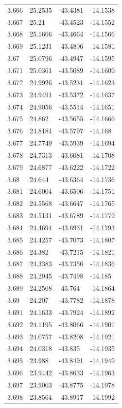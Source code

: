 \begin{tabular}{llll}
3.666 & 25.2535 & -43.4381 & -14.1538 \\
3.667 & 25.21 & -43.4523 & -14.1552 \\
3.668 & 25.1666 & -43.4664 & -14.1566 \\
3.669 & 25.1231 & -43.4806 & -14.1581 \\
3.67 & 25.0796 & -43.4947 & -14.1595 \\
3.671 & 25.0361 & -43.5089 & -14.1609 \\
3.672 & 24.9926 & -43.5231 & -14.1623 \\
3.673 & 24.9491 & -43.5372 & -14.1637 \\
3.674 & 24.9056 & -43.5514 & -14.1651 \\
3.675 & 24.862 & -43.5655 & -14.1666 \\
3.676 & 24.8184 & -43.5797 & -14.168 \\
3.677 & 24.7749 & -43.5939 & -14.1694 \\
3.678 & 24.7313 & -43.6081 & -14.1708 \\
3.679 & 24.6877 & -43.6222 & -14.1722 \\
3.68 & 24.644 & -43.6364 & -14.1736 \\
3.681 & 24.6004 & -43.6506 & -14.1751 \\
3.682 & 24.5568 & -43.6647 & -14.1765 \\
3.683 & 24.5131 & -43.6789 & -14.1779 \\
3.684 & 24.4694 & -43.6931 & -14.1793 \\
3.685 & 24.4257 & -43.7073 & -14.1807 \\
3.686 & 24.382 & -43.7215 & -14.1821 \\
3.687 & 24.3383 & -43.7356 & -14.1836 \\
3.688 & 24.2945 & -43.7498 & -14.185 \\
3.689 & 24.2508 & -43.764 & -14.1864 \\
3.69 & 24.207 & -43.7782 & -14.1878 \\
3.691 & 24.1633 & -43.7924 & -14.1892 \\
3.692 & 24.1195 & -43.8066 & -14.1907 \\
3.693 & 24.0757 & -43.8208 & -14.1921 \\
3.694 & 24.0318 & -43.835 & -14.1935 \\
3.695 & 23.988 & -43.8491 & -14.1949 \\
3.696 & 23.9442 & -43.8633 & -14.1963 \\
3.697 & 23.9003 & -43.8775 & -14.1978 \\
3.698 & 23.8564 & -43.8917 & -14.1992 \\

\end{tabular}

